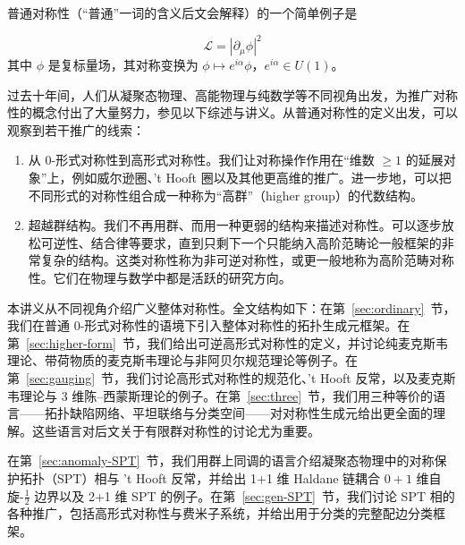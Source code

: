 普通对称性（“普通”一词的含义后文会解释）的一个简单例子是

\begin{example}
\[ \mathcal{L} = |\partial_\mu \phi|^2 \]
其中 $\phi$ 是复标量场，其对称变换为 $\phi\mapsto e^{i\alpha}\phi$，$e^{i\alpha}\in U(1)$。
\end{example}

过去十年间，人们从凝聚态物理、高能物理与纯数学等不同视角出发，为推广对称性的概念付出了大量努力\cite{Gaiotto:2014kfa}，参见以下综述与讲义\cite{Kong_2020,mcgreevy2022generalized,Cordova:2022ruw,Gomes:2023ahz,Schafer-Nameki:2023jdn,Brennan:2023mmt,Bhardwaj:2023kri}。从普通对称性的定义出发，可以观察到若干推广的线索：
\begin{enumerate}
  \item 从 $0$-形式对称性到高形式对称性。我们让对称操作作用在“维数 $\ge 1$ 的延展对象”上，例如威尔逊圈、't Hooft 圈以及其他更高维的推广。进一步地，可以把不同形式的对称性组合成一种称为“高群”（higher group）的代数结构。
  \item 超越群结构。我们不再用群、而用一种更弱的结构来描述对称性。可以逐步放松可逆性、结合律等要求，直到只剩下一个只能纳入高阶范畴论一般框架的非常复杂的结构。这类对称性称为非可逆对称性，或更一般地称为高阶范畴对称性。它们在物理与数学中都是活跃的研究方向\cite{Kong_2020,ji2020categorical,Johnson-Freyd:2020usu,Roumpedakis:2022aik,Bhardwaj:2022yxj,Bhardwaj:2022lsg,Bartsch:2022mpm,Bhardwaj:2022kot,Kaidi:2022cpf,Decoppet:2022dnz,Bhardwaj:2022maz,Bartsch:2022ytj,Delcamp:2023kew,Kaidi:2023maf,Bhardwaj:2023wzd,Bartsch:2023pzl,Bhardwaj:2023ayw,Bartsch:2023wvv,Decoppet:2023bay}。
\end{enumerate}

本讲义从不同视角介绍广义整体对称性。全文结构如下：在第~\ref{sec:ordinary}~节，我们在普通 $0$-形式对称性的语境下引入整体对称性的拓扑生成元框架。在第~\ref{sec:higher-form}~节，我们给出可逆高形式对称性的定义，并讨论纯麦克斯韦理论、带荷物质的麦克斯韦理论与非阿贝尔规范理论等例子。在第~\ref{sec:gauging}~节，我们讨论高形式对称性的规范化、't Hooft 反常，以及麦克斯韦理论与 3 维陈–西蒙斯理论的例子。在第~\ref{sec:three}~节，我们用三种等价的语言——拓扑缺陷网络、平坦联络与分类空间——对对称性生成元给出更全面的理解。这些语言对后文关于有限群对称性的讨论尤为重要。

在第~\ref{sec:anomaly-SPT}~节，我们用群上同调的语言介绍凝聚态物理中的对称保护拓扑（SPT）相与 't Hooft 反常，并给出 1+1 维 Haldane 链耦合 $0+1$ 维自旋-$\frac{1}{2}$ 边界以及 2+1 维 SPT 的例子。在第~\ref{sec:gen-SPT}~节，我们讨论 SPT 相的各种推广，包括高形式对称性与费米子系统，并给出用于分类的完整配边分类框架。

